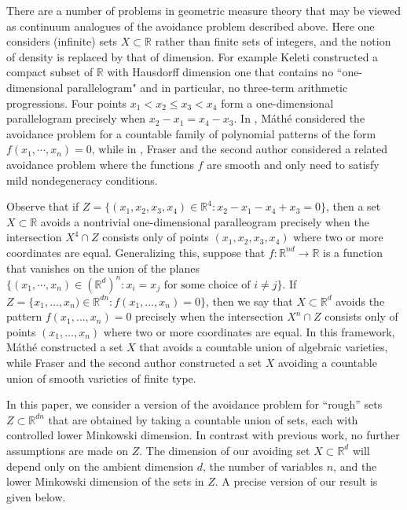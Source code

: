 \documentclass[usenames,dvipsnames,letterpaper, reqno,11pt]{article}
\theoremstyle{plain}
\theoremstyle{plain}
\newcommand{\RR}{\mathbb{R}}
\begin{document}
There are a number of problems in geometric measure theory that may be viewed as continuum analogues of the avoidance problem described above. Here one considers (infinite) sets $X\subset\RR$ rather than finite sets of integers, and the notion of density is replaced by that of dimension. For example Keleti \cite{KeletiDimOneSet} constructed a compact subset of $\RR$ with Hausdorff dimension one that contains no ``one-dimensional parallelogram" and in particular, no three-term arithmetic progressions. Four points $x_1<x_2 \leq x_3 < x_4$ form a one-dimensional parallelogram precisely when $x_2-x_1 = x_4-x_3$. In \cite{Mathe}, M\'ath\'e considered the avoidance problem for a countable family of polynomial patterns of the form $f(x_1, \cdots, x_n) = 0$, while in \cite{MalabikaRob}, Fraser and the second author considered a related avoidance problem where the functions $f$ are smooth and only need to satisfy mild nondegeneracy conditions.

Observe that if $Z = \{(x_1,x_2,x_3, x_4)\in\RR^4 \colon x_2- x_1 - x_4 + x_3 =0\}$, then a set $X\subset\RR$ avoids a nontrivial one-dimensional paralleogram precisely when the intersection $X^4\cap Z$ consists only of points $(x_1,x_2,x_3, x_4)$ where two or more coordinates are equal. Generalizing this, suppose that $f: \mathbb R^{nd} \rightarrow \mathbb R$ is a function that vanishes on the union of the planes $\{(x_1, \cdots, x_n) \in (\mathbb R^d)^n : x_i = x_j \text{ for some choice of } i \neq j \}$. If $Z = \{x_1,\ldots,x_n)\in\RR^{dn}\colon f(x_1,\ldots,x_n)=0\}$, then we say that $X\subset\RR^d$ avoids the pattern $f(x_1,\ldots,x_n)=0$ precisely when the intersection $X^n\cap Z$ consists only of points $(x_1,\ldots,x_n)$ where two or more coordinates are equal. In this framework, M\'ath\'e \cite{Mathe} constructed a set $X$ that avoids a countable union of algebraic varieties, while Fraser and the second author \cite{MalabikaRob} constructed a set $X$ avoiding a countable union of smooth varieties of finite type.

In this paper, we consider a version of the avoidance problem for ``rough'' sets $Z\subset\RR^{dn}$ that are obtained by taking a countable union of sets, each with controlled lower Minkowski dimension. In contrast with previous work, no further assumptions are made on $Z$. The dimension of our avoiding set $X\subset\RR^d$ will depend only on the ambient dimension $d$, the number of variables $n$, and the lower Minkowski dimension of the sets in $Z$. A precise version of our result is given below. 
\end{document}
